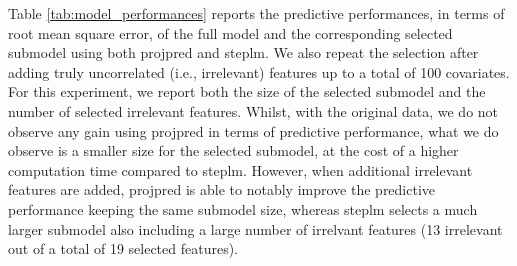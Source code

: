 \documentclass[american,]{article}
\theoremstyle{definition}
\begin{document}

Table \ref{tab:model_performances} reports the predictive performances, in terms of root mean square error, of the full model and the corresponding selected submodel using both projpred and steplm. We also repeat the selection after adding truly uncorrelated (i.e., irrelevant) features up to a total of 100 covariates. For this experiment, we report both the size of the selected submodel and the number of selected irrelevant features. Whilst, with the original data, we do not observe any gain using projpred in terms of predictive performance, what we do observe is a smaller size for the selected submodel, at the cost of a higher computation time compared to steplm. However, when additional irrelevant features are added, projpred is able to notably improve the predictive performance keeping the same submodel size, whereas steplm selects a much larger submodel also including a large number of irrelvant features (13 irrelevant out of a total of 19 selected features).
\end{document}
